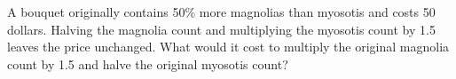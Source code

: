 A bouquet originally contains 50\% more magnolias than myosotis and costs 50 dollars. Halving the magnolia count and multiplying the myosotis count by 1.5 leaves the price unchanged. What would it cost to multiply the original magnolia count by 1.5 and halve the original myosotis count?
